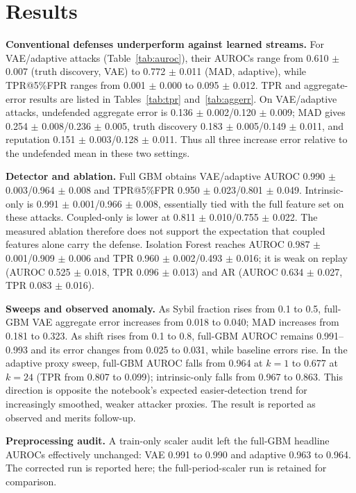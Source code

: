 \documentclass[conference]{IEEEtran}
\begin{document}
\section{Results}
\textbf{Conventional defenses underperform against learned streams.} For VAE/adaptive attacks (Table~\ref{tab:auroc}), their AUROCs range from 0.610 $\pm$ 0.007 (truth discovery, VAE) to 0.772 $\pm$ 0.011 (MAD, adaptive), while TPR@5\%FPR ranges from 0.001 $\pm$ 0.000 to 0.095 $\pm$ 0.012. TPR and aggregate-error results are listed in Tables~\ref{tab:tpr} and~\ref{tab:aggerr}. On VAE/adaptive attacks, undefended aggregate error is 0.136 $\pm$ 0.002/0.120 $\pm$ 0.009; MAD gives 0.254 $\pm$ 0.008/0.236 $\pm$ 0.005, truth discovery 0.183 $\pm$ 0.005/0.149 $\pm$ 0.011, and reputation 0.151 $\pm$ 0.003/0.128 $\pm$ 0.011. Thus all three increase error relative to the undefended mean in these two settings.

\textbf{Detector and ablation.} Full GBM obtains VAE/adaptive AUROC 0.990 $\pm$ 0.003/0.964 $\pm$ 0.008 and TPR@5\%FPR 0.950 $\pm$ 0.023/0.801 $\pm$ 0.049. Intrinsic-only is 0.991 $\pm$ 0.001/0.966 $\pm$ 0.008, essentially tied with the full feature set on these attacks. Coupled-only is lower at 0.811 $\pm$ 0.010/0.755 $\pm$ 0.022. The measured ablation therefore does not support the expectation that coupled features alone carry the defense. Isolation Forest reaches AUROC 0.987 $\pm$ 0.001/0.909 $\pm$ 0.006 and TPR 0.960 $\pm$ 0.002/0.493 $\pm$ 0.016; it is weak on replay (AUROC 0.525 $\pm$ 0.018, TPR 0.096 $\pm$ 0.013) and AR (AUROC 0.634 $\pm$ 0.027, TPR 0.083 $\pm$ 0.016).

\textbf{Sweeps and observed anomaly.} As Sybil fraction rises from 0.1 to 0.5, full-GBM VAE aggregate error increases from 0.018 to 0.040; MAD increases from 0.181 to 0.323. As shift rises from 0.1 to 0.8, full-GBM AUROC remains 0.991--0.993 and its error changes from 0.025 to 0.031, while baseline errors rise. In the adaptive proxy sweep, full-GBM AUROC falls from 0.964 at $k{=}1$ to 0.677 at $k{=}24$ (TPR from 0.807 to 0.099); intrinsic-only falls from 0.967 to 0.863. This direction is opposite the notebook's expected easier-detection trend for increasingly smoothed, weaker attacker proxies. The result is reported as observed and merits follow-up.

\textbf{Preprocessing audit.} A train-only scaler audit left the full-GBM headline AUROCs effectively unchanged: VAE 0.991 to 0.990 and adaptive 0.963 to 0.964. The corrected run is reported here; the full-period-scaler run is retained for comparison.
\end{document}
